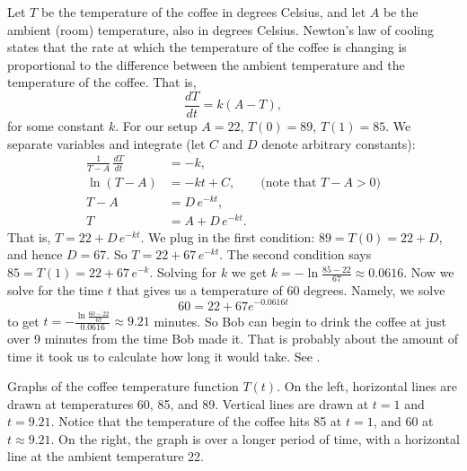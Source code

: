 \documentclass{ximera}
\begin{document}
\begin{exampleSol}
    Let $T$ be the temperature of the coffee in degrees Celsius, and let $A$ be the ambient (room) temperature, also in degrees Celsius. Newton's law of cooling states that the rate at which the temperature of the coffee is changing is proportional to the difference between the ambient temperature and the temperature of the coffee.  That is,
    \begin{equation*}
        \frac{dT}{dt} = k(A-T) ,
    \end{equation*}
    for some constant $k$. For our setup $A=22$, $T(0) = 89$, $T(1) = 85$. We separate variables and integrate (let $C$ and $D$ denote arbitrary constants):
    \begin{align*}
        \frac{1}{T-A} \, \frac{dT}{dt} & = -k , \\
        \ln (T-A) &= -kt + C , \qquad \text{(note that } T-A > 0 \text{)} \\
        T-A &= D\, e^{-kt} ,  \\
        T &= A + D\, e^{-kt} .
    \end{align*}
    That is, $T = 22 + D\, e^{-kt}$.  We plug in the first condition: $89 = T(0) = 22 +D$, and hence $D = 67$.  So $T = 22 + 67\, e^{-kt}$.  The second condition says $85 = T(1) = 22 + 67\, e^{-k}$.  Solving for $k$ we get $k = - \ln \frac{85-22}{67} \approx 0.0616$.  Now we solve for the time $t$ that gives us a temperature of 60 degrees.  Namely, we solve
    \begin{equation*}
        60 = 22 + 67 e^{-0.0616t}
    \end{equation*}
    to get $t = - \frac{\ln \frac{60-22}{67}}{0.0616} \approx 9.21$ minutes.  So Bob can begin to drink the coffee at just over 9 minutes from the time Bob made it.  That is probably about the amount of time it took us to calculate how long it would take.  See .
    \begin{myfig}
        \capstart
        \caption{Graphs of the coffee temperature function $T(t)$. On the left, horizontal lines are drawn at temperatures 60, 85, and 89.  Vertical lines are drawn at $t=1$ and $t=9.21$.  Notice that the temperature of the coffee hits 85 at $t=1$, and 60 at $t \approx 9.21$.  On the right, the graph is over a longer period of time, with a horizontal line at the ambient temperature 22.\label{sintro:coffeefig}}
    \end{myfig}
\end{exampleSol}
\end{document}
